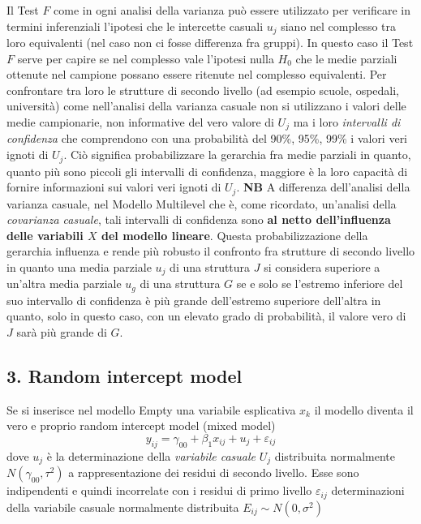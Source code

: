 \documentclass[a4page, 11pt]{article} %
\begin{document}
Il Test $F$ come in ogni analisi della varianza può essere utilizzato per verificare in termini inferenziali l’ipotesi che le intercette casuali $u_j$ siano nel complesso tra loro equivalenti (nel caso non ci fosse differenza fra gruppi). In questo caso il Test $F$ serve per capire se nel complesso vale l’ipotesi nulla $H_0$ che le medie parziali ottenute nel campione possano essere ritenute nel complesso equivalenti. Per confrontare tra loro le strutture di secondo livello (ad esempio scuole, ospedali, università) come nell’analisi della varianza casuale non si utilizzano i valori delle medie campionarie, non informative del vero valore di $U_j$ ma i loro \textit{intervalli di confidenza} che comprendono con una probabilità del 90\%, 95\%, 99\% i valori veri ignoti di $U_j$.
Ciò significa probabilizzare la gerarchia fra medie parziali in quanto, quanto più sono piccoli gli intervalli di confidenza, maggiore è la loro capacità di fornire informazioni sui valori veri ignoti di $U_j$. 
\newline
\newline
\textbf{NB} A differenza dell’analisi della varianza casuale, nel Modello Multilevel che è, come ricordato, un’analisi della \textit{covarianza casuale}, tali intervalli di confidenza sono \textbf{al netto dell’influenza delle variabili $X$ del modello lineare}. Questa probabilizzazione della gerarchia influenza e rende più robusto il confronto fra strutture di secondo livello in quanto una media parziale $u_j$ di una struttura $J$ si considera superiore a un’altra media parziale $u_g$ di una struttura $G$ se e solo se l’estremo inferiore del suo intervallo di confidenza è più grande dell’estremo superiore dell’altra in quanto, solo in questo caso, con un elevato grado di probabilità, il valore vero di $J$ sarà più grande di $G$.

\subsection*{3. Random intercept model}
Se si inserisce nel modello Empty una variabile esplicativa $x_k$ il modello diventa il vero e proprio random intercept model (mixed model) 
\begin{equation*}
y_{ij}=\gamma_{00}+\beta_1 x_{ij}+ u_j + \varepsilon_{ij} 
\end{equation*}
dove $u_j$ è la determinazione della \textit{variabile casuale} $U_j$ distribuita normalmente $N(\gamma_{00}, \tau^2)$ a rappresentazione dei residui di secondo livello. Esse sono indipendenti e quindi incorrelate con i residui di primo livello $\varepsilon_{ij}$ determinazioni della variabile casuale normalmente distribuita $E_{ij} \sim N(0,\sigma^2)$
\end{document}
